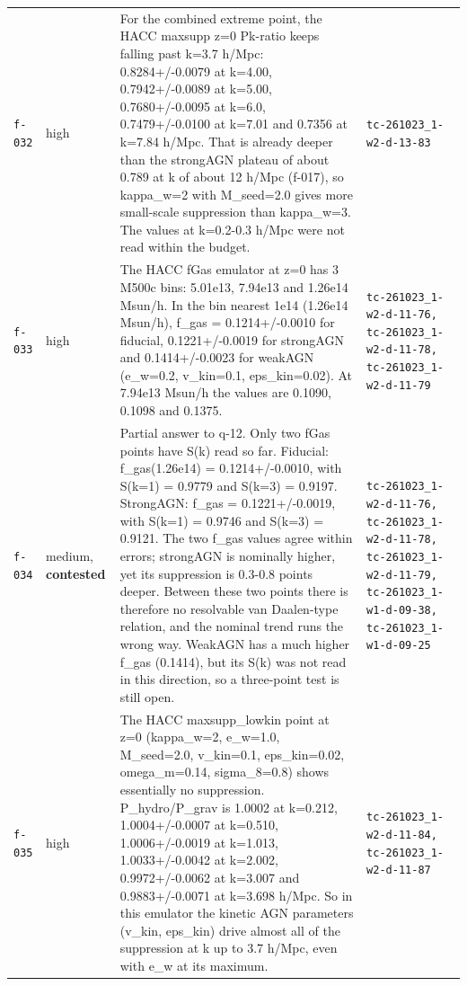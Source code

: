 \documentclass[11pt,a4paper]{article}
\begin{document}
\begin{longtable}{@{}p{}p{}p{}p{}@{}}
\texttt{f-032} & high & For the combined extreme point, the HACC maxsupp z=0 Pk-ratio keeps falling past k=3.7 h/Mpc: 0.8284+/-0.0079 at k=4.00, 0.7942+/-0.0089 at k=5.00, 0.7680+/-0.0095 at k=6.0, 0.7479+/-0.0100 at k=7.01 and 0.7356 at k=7.84 h/Mpc. That is already deeper than the strongAGN plateau of about 0.789 at k of about 12 h/Mpc (f-017), so kappa\_w=2 with M\_seed=2.0 gives more small-scale suppression than kappa\_w=3. The values at k=0.2-0.3 h/Mpc were not read within the budget. & \texttt{tc-261023\_\allowbreak{}1-w2-d-13-83} \\
\texttt{f-033} & high & The HACC fGas emulator at z=0 has 3 M500c bins: 5.01e13, 7.94e13 and 1.26e14 Msun/h. In the bin nearest 1e14 (1.26e14 Msun/h), f\_gas = 0.1214+/-0.0010 for fiducial, 0.1221+/-0.0019 for strongAGN and 0.1414+/-0.0023 for weakAGN (e\_w=0.2, v\_kin=0.1, eps\_kin=0.02). At 7.94e13 Msun/h the values are 0.1090, 0.1098 and 0.1375. & \texttt{tc-261023\_\allowbreak{}1-w2-d-11-76,\allowbreak{} tc-261023\_\allowbreak{}1-w2-d-11-78,\allowbreak{} tc-261023\_\allowbreak{}1-w2-d-11-79} \\
\texttt{f-034} & medium, \textbf{contested} & Partial answer to q-12. Only two fGas points have S(k) read so far. Fiducial: f\_gas(1.26e14) = 0.1214+/-0.0010, with S(k=1) = 0.9779 and S(k=3) = 0.9197. StrongAGN: f\_gas = 0.1221+/-0.0019, with S(k=1) = 0.9746 and S(k=3) = 0.9121. The two f\_gas values agree within errors; strongAGN is nominally higher, yet its suppression is 0.3-0.8 points deeper. Between these two points there is therefore no resolvable van Daalen-type relation, and the nominal trend runs the wrong way. WeakAGN has a much higher f\_gas (0.1414), but its S(k) was not read in this direction, so a three-point test is still open. & \texttt{tc-261023\_\allowbreak{}1-w2-d-11-76,\allowbreak{} tc-261023\_\allowbreak{}1-w2-d-11-78,\allowbreak{} tc-261023\_\allowbreak{}1-w2-d-11-79,\allowbreak{} tc-261023\_\allowbreak{}1-w1-d-09-38,\allowbreak{} tc-261023\_\allowbreak{}1-w1-d-09-25} \\
\texttt{f-035} & high & The HACC maxsupp\_lowkin point at z=0 (kappa\_w=2, e\_w=1.0, M\_seed=2.0, v\_kin=0.1, eps\_kin=0.02, omega\_m=0.14, sigma\_8=0.8) shows essentially no suppression. P\_hydro/P\_grav is 1.0002 at k=0.212, 1.0004+/-0.0007 at k=0.510, 1.0006+/-0.0019 at k=1.013, 1.0033+/-0.0042 at k=2.002, 0.9972+/-0.0062 at k=3.007 and 0.9883+/-0.0071 at k=3.698 h/Mpc. So in this emulator the kinetic AGN parameters (v\_kin, eps\_kin) drive almost all of the suppression at k up to 3.7 h/Mpc, even with e\_w at its maximum. & \texttt{tc-261023\_\allowbreak{}1-w2-d-11-84,\allowbreak{} tc-261023\_\allowbreak{}1-w2-d-11-87} \\

\end{longtable}
\end{document}

